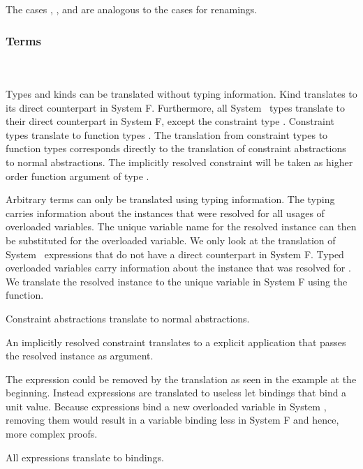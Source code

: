 \noindent The cases , ,  and  are analogous to the cases for renamings. 

\subsubsection{Terms}\hfill\\\\
Types and kinds can be translated without typing information. Kind  translates to its direct counterpart in System F. 
Furthermore, all System \Fo\ types translate to their direct counterpart in System F, except the constraint type \Constr{[}  \Constr{:}  \Constr{]⇒} .
\DPTType
Constraint types \Constr{[}  \Constr{:}  \Constr{]⇒}  translate to function types   . 
The translation from constraint types to function types corresponds directly to the translation of constraint abstractions to normal abstractions. 
The implicitly resolved constraint will be taken as higher order function argument of type .

\noindent Arbitrary terms can only be translated using typing information. 
The typing carries information about the instances that were resolved for all usages of overloaded variables. 
The unique variable name for the resolved instance can then be substituted for the overloaded variable. 
We only look at the translation of System \Fo\ expressions that do not have a direct counterpart in System F.
\DPTTerms
Typed overloaded variables  carry information about the instance that was resolved for .
We translate the resolved instance to the unique variable in System F using the  function.

\noindent Constraint abstractions translate to normal abstractions. 

\noindent An implicitly resolved constraint translates to a explicit application that passes the resolved instance as argument. 

\noindent The  expression could be removed by the translation as seen in the example at the beginning. 
Instead  expressions are translated to useless let bindings that bind a unit value.
Because  expressions bind a new overloaded variable in System \Fo, removing them would result in a variable binding less in System F and hence, more complex proofs.

\noindent All  expressions translate to  bindings.

